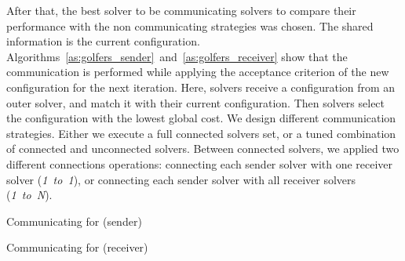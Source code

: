 After that, the best solver to be communicating solvers to compare their performance with the non communicating strategies was chosen. The shared information is the current configuration. Algorithms~\ref{as:golfers_sender}~and~\ref{as:golfers_receiver} show that the communication is performed while applying the acceptance criterion of the new configuration for the next iteration. Here, solvers receive a configuration from an outer solver, and match it with their current configuration. Then solvers select the configuration with the lowest global cost. 
We design different communication strategies. Either we execute a full connected solvers set, or a tuned combination of connected and unconnected solvers. Between connected solvers, we applied two different connections operations: connecting each sender solver with one receiver solver ({\it 1~to~1}), or connecting each sender solver with all receiver solvers ({\it 1~to~N}).

\begin{algorithm}
\dontprintsemicolon
\SetNoline
{}
\caption{Communicating \as{} for \SGP{} (sender)}\label{as:golfers_sender}
\end{algorithm}

\begin{algorithm}
\dontprintsemicolon
\SetNoline
{}
\caption{Communicating \as{} for \SGP{} (receiver)}\label{as:golfers_receiver}
\end{algorithm}

